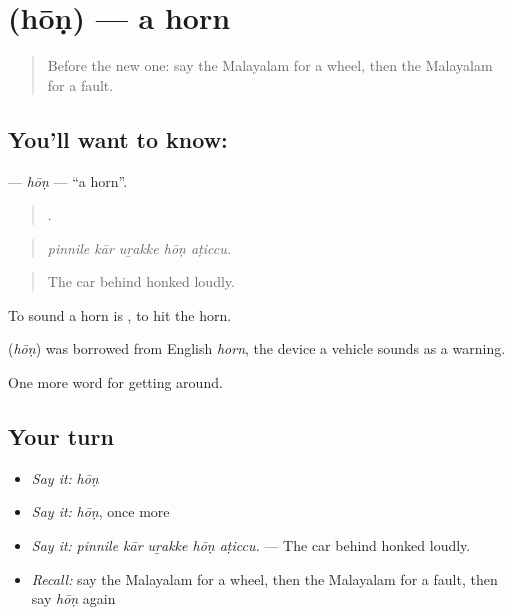 \section[\texorpdfstring{\ml{ഹോൺ} (hōṇ)}{ഹോൺ (hōṇ)}]{ (hōṇ) — a horn}

\label{lesson:ML-C471-hon}



\begin{quote}
Before the new one: say the Malayalam for a wheel, then the Malayalam for a fault.
\end{quote}

\subsection*{You'll want to know: }
\textbf{} — \emph{hōṇ} — \textquotedblleft{}a horn\textquotedblright{}.

\begin{quote}
    .
\end{quote}

\begin{quote}
\emph{pinnile kār uṟakke hōṇ aṭiccu.}
\end{quote}

\begin{quote}
The car behind honked loudly.
\end{quote}

To sound a horn is  , to hit the horn.

\begin{cousinweb}
\textbf{} (\emph{hōṇ}) was borrowed from English \emph{horn}, the device a vehicle sounds as a warning.
\end{cousinweb}

\begin{grammarlens}[title={What you've built}]
One more word for getting around.
\end{grammarlens}

\subsection*{Your turn}
\begin{itemize}
\raggedright
  \item \emph{Say it:} \emph{hōṇ}
  \item \emph{Say it:} \emph{hōṇ}, once more
  \item \emph{Say it:} \emph{pinnile kār uṟakke hōṇ aṭiccu.} — The car behind honked loudly.
  \item \emph{Recall:} say the Malayalam for a wheel, then the Malayalam for a fault, then say \emph{hōṇ} again
\end{itemize}

